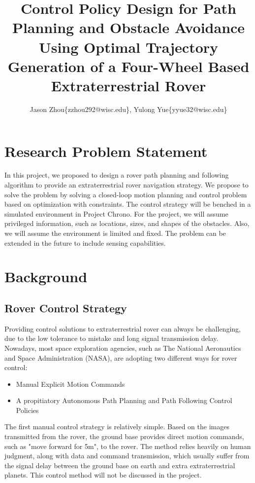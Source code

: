 \documentclass{article}
\title{Control Policy Design for Path Planning and Obstacle Avoidance Using Optimal Trajectory Generation of a Four-Wheel Based Extraterrestrial Rover}
\author{Jason Zhou\{zzhou292@wisc.edu\}, Yulong Yue\{yyue32@wisc.edu\}}
\begin{document}
\maketitle


\section{Research Problem Statement}
In this project, we proposed to design a rover path planning and following algorithm to provide an extraterrestrial rover navigation strategy. We propose to solve the problem by solving a closed-loop motion planning and control problem based on optimization with constraints. The control strategy will be benched in a simulated environment in Project Chrono. For the project, we will assume privileged information, such as locations, sizes, and shapes of the obstacles. Also, we will assume the environment is limited and fixed. The problem can be extended in the future to include sensing capabilities.


\section{Background}
\subsection{Rover Control Strategy}
Providing control solutions to extraterrestrial rover can always be challenging, due to the low tolerance to mistake and long signal transmission delay. Nowadays, most space exploration agencies, such as The National Aeronautics and Space Administration (NASA), are adopting two different ways for rover control:

\begin{itemize}
    \item Manual Explicit Motion Commands
    \item A propitiatory Autonomous Path Planning and Path Following Control Policies
\end{itemize}

The first manual control strategy is relatively simple. Based on the images transmitted from the rover, the ground base provides direct motion commands, such as "move forward for 5m", to the rover. The method relies heavily on human judgment, along with data and command transmission, which usually suffer from the signal delay between the ground base on earth and extra extraterrestrial planets. This control method will not be discussed in the project.
\end{document}

